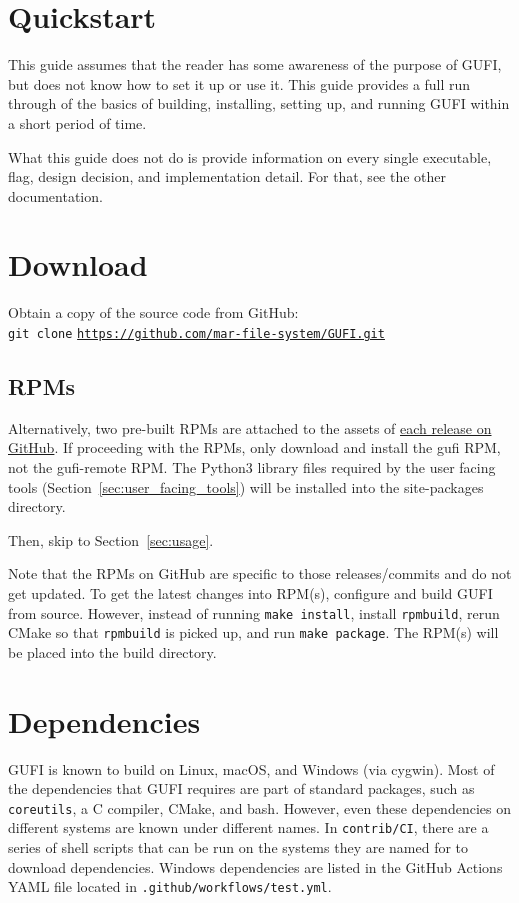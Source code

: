 \section{Quickstart}
This guide assumes that the reader has some awareness of the purpose
of GUFI, but does not know how to set it up or use it. This guide
provides a full run through of the basics of building, installing,
setting up, and running GUFI within a short period of time.

What this guide does not do is provide information on every single
executable, flag, design decision, and implementation detail. For that,
see the other documentation.

\section{Download}
Obtain a copy of the source code from GitHub: \\

\indent \texttt{git clone}
\href{https://github.com/mar-file-system/GUFI.git}{\texttt{https://github.com/mar-file-system/GUFI.git}}

\subsection{RPMs}
Alternatively, two pre-built RPMs are attached to the assets of
\href{https://github.com/mar-file-system/GUFI/releases}{each release
 on GitHub}. If proceeding with the RPMs, only download and install
the gufi RPM, not the gufi-remote RPM. The Python3 library files
required by the user facing tools
(Section~\ref{sec:user_facing_tools}) will be installed into the
site-packages directory.

Then, skip to Section~\ref{sec:usage}.

Note that the RPMs on GitHub are specific to those releases/commits
and do not get updated. To get the latest changes into RPM(s),
configure and build GUFI from source. However, instead of running
\texttt{make install}, install \texttt{rpmbuild}, rerun CMake so that
\texttt{rpmbuild} is picked up, and run \texttt{make package}. The
RPM(s) will be placed into the build directory.

\section{Dependencies}
GUFI is known to build on Linux, macOS, and Windows (via cygwin).
Most of the dependencies that GUFI requires are part of standard
packages, such as \texttt{coreutils}, a C compiler, CMake, and
bash. However, even these dependencies on different systems are known
under different names. In \texttt{contrib/CI}, there are a series of
shell scripts that can be run on the systems they are named for to
download dependencies. Windows dependencies are listed in the GitHub
Actions YAML file located in \texttt{.github/workflows/test.yml}.

